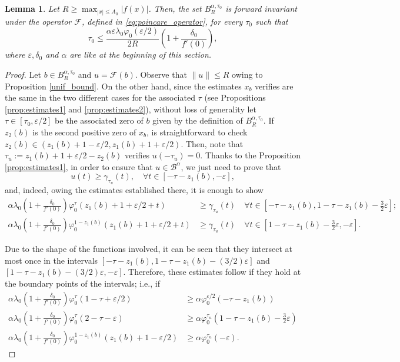 \documentclass[a4paper,11pt]{article}
\theoremstyle{plain}
\newtheorem{lem}[thm]{Lemma}
\theoremstyle{definition}
\theoremstyle{definition}
\newcommand{\B}{\mathcal{B}}
\newcommand{\Fcal}{\mathcal{F}}
\numberwithin{equation}{section}
\begin{document}
\begin{lem}\label{lem:invariance_B}
    Let $R\geq \max_{|x|\leq A_0} |f(x)|$. Then, the set $B^{\alpha,\tau_0}_R$ is forward invariant under the operator $\Fcal$, defined in \eqref{eq:poincare_operator},  for every $\tau_0$ such that
    \begin{equation}\label{eq:tau0}
        \tau_0 \leq \frac{\alpha\varepsilon \lambda_0 \varphi_0(\varepsilon/2)}{2R} \left( 1+\frac{\delta_0}{f'(0)} \right),
    \end{equation}
    where $\varepsilon,\delta_0$ and $\alpha$ are like at the beginning of this section.
\end{lem}
\begin{proof}
Let $b\in B^{\alpha,\tau_0}_R$ and $u=\Fcal(b)$. Observe that $\|u\|\leq R$ owing to Proposition \ref{unif_bound}. On the other hand, since the estimates $x_b$ verifies are the same in the two different cases for the associated $\tau$ (see Propositions \ref{prop:estimates1} and \ref{prop:estimates2}), without loss of generality let $\tau\in[\tau_0,\varepsilon/2]$ be the associated zero of $b$ given by the definition of $B^{\alpha,\tau_0}_R$. If $z_2(b)$ is the second positive zero of $x_b$, is straightforward to check $z_2(b)\in(z_1(b)+1-\varepsilon/2, z_1(b)+1+\varepsilon/2  )$. Then, note that $\tau_u := z_1(b)+1+\varepsilon/2 - z_2(b)$ verifies $u(-\tau_u)=0$. Thanks to the Proposition \ref{prop:estimates1}, in order to ensure that $u\in \B^\alpha$, we just need to prove that
\[
    u(t) \geq \gamma_{\tau_u}(t), \quad \forall t\in[ -\tau-z_1(b), -\varepsilon ],
\]
and, indeed, owing the estimates established there, it is enough to show
\begin{align*}
    \alpha\lambda_0 \left( 1+\frac{\delta_0}{f'(0)} \right) \varphi_0^\tau(z_1(b)+1+\varepsilon/2+t) &\geq \gamma_{\tau_u}(t) \quad \forall t\in[-\tau-z_1(b),1-\tau-z_1(b)-\frac{3}{2}\varepsilon]; \\
    \alpha\lambda_0\left( 1+\frac{\delta_0}{f'(0)} \right) \varphi_0^{1-z_1(b)}(z_1(b)+1+\varepsilon/2+t)&\geq \gamma_{\tau_u}(t) \quad \forall t\in[1-\tau-z_1(b)-\frac{3}{2}\varepsilon,-\varepsilon].
\end{align*}

Due to the shape of the functions involved, it can be seen that they intersect at most once in the intervals $[-\tau-z_1(b), 1-\tau - z_1(b) - (3/2)\varepsilon]$ and $[1-\tau - z_1(b) - (3/2)\varepsilon , -\varepsilon]$. Therefore, these estimates follow if they hold at the boundary points of the intervals; i.e., if
\begin{align*}
    \alpha\lambda_0 \left( 1+\frac{\delta_0}{f'(0)} \right) \varphi_0^\tau(1-\tau+\varepsilon/2) &\geq \alpha\varphi_0^{\varepsilon/2}(-\tau-z_1(b)) \\
    \alpha\lambda_0 \left( 1+\frac{\delta_0}{f'(0)} \right) \varphi_0^\tau(2-\tau-\varepsilon) &\geq \alpha\varphi_0^{\tau_u}(1-\tau-z_1(b)-\frac{3}{2}\varepsilon) \\
    \alpha\lambda_0 \left( 1+\frac{\delta_0}{f'(0)} \right) \varphi_0^{1-z_1(b)}(z_1(b)+1-\varepsilon/2) &\geq \alpha\varphi_0^{\tau_u}(-\varepsilon).
\end{align*}


\end{proof}
\end{document}
